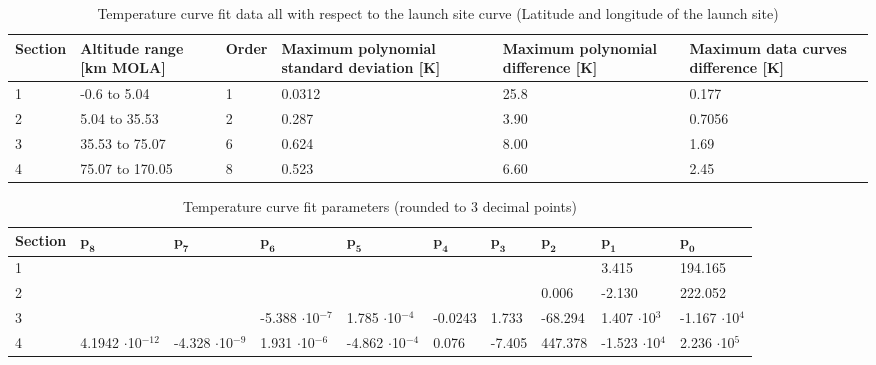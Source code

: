 \begin{table}[H]
\begin{center}
\caption{Temperature curve fit data all with respect to the launch site curve (Latitude and longitude of the launch site)}
\label{tab:fitDeviations}
\begin{tabular}{|l|l|l|p{3cm}|p{3cm}|p{3cm}|}
\hline 
\textbf{Section} & \textbf{Altitude range [km MOLA]} & \textbf{Order}	& \textbf{Maximum polynomial standard deviation [K]} & \textbf{Maximum polynomial difference [K]} & \textbf{Maximum data curves difference [K]} \\ \hline 
1 & -0.6 to 5.04 & 1 & 0.0312 & 25.8 & 0.177 \\ \hline
2 & 5.04 to 35.53 & 2 & 0.287 & 3.90 & 0.7056 \\ \hline
3 & 35.53 to 75.07 & 6 & 0.624 & 8.00 & 1.69 \\ \hline
4 & 75.07 to 170.05 & 8 & 0.523 & 6.60 & 2.45 \\ \hline
\end{tabular}
\end{center}
\end{table}

\begin{table}[H]
\begin{center}
\caption{Temperature curve fit parameters (rounded to 3 decimal points)}
\label{tab:fitParameters}
\begin{tabular}{|l||p{1.1cm}|p{1.1cm}|p{1.1cm}|p{1.1cm}|p{1.1cm}|p{1.1cm}|p{1.1cm}|p{1.1cm}|p{1.1cm}|}
\hline 
\textbf{Section}  & $\mathbf{p_{8}}$ & $\mathbf{p_{7}}$ & $\mathbf{p_{6}}$ & $\mathbf{p_{5}}$ & $\mathbf{p_{4}}$ & $\mathbf{p_{3}}$ & $\mathbf{p_{2}}$ & $\mathbf{p_{1}}$ & $\mathbf{p_{0}}$ \\ \hline 
1 &  &  &  &  &  &  & & 3.415 & 194.165   \\ \hline
2 &  &  &  &  &  & & 0.006 & -2.130 & 222.052   \\ \hline
3  &  &  & -5.388 $\cdot$10$^{-7}$ & 1.785 $\cdot$10$^{-4}$ & -0.0243 & 1.733 & -68.294 & 1.407 $\cdot$10$^{3}$ & -1.167 $\cdot$10$^{4}$ \\ \hline
4  & 4.1942 $\cdot$10$^{-12}$ & -4.328 $\cdot$10$^{-9}$ & 1.931 $\cdot$10$^{-6}$ & -4.862 $\cdot$10$^{-4}$ & 0.076 & -7.405 & 447.378 & -1.523 $\cdot$10$^{4}$ & 2.236 $\cdot$10$^{5}$ \\ \hline
\end{tabular}
\end{center}
\end{table}


